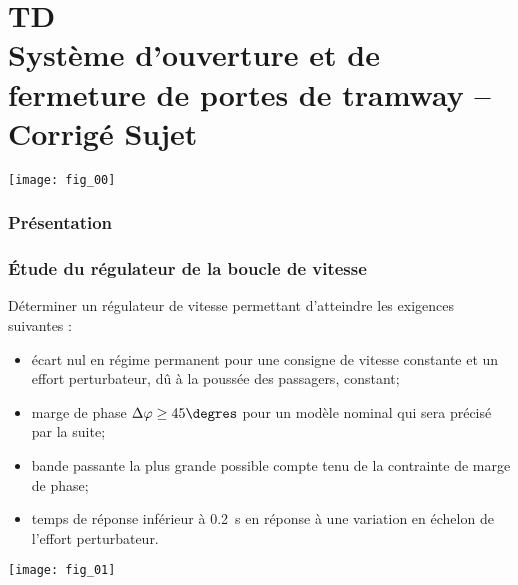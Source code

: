 \chapter*{TD  \\ 
Système d’ouverture et de fermeture de portes de tramway -- 
\ifprof Corrigé \else Sujet \fi}

\iflivret {} \else
\ifprof  {} \else \fi
\fi

\setcounter{question}{0}

\begin{marginfigure}[4cm]
\centering
\texttt{[image: fig\_00]}
\end{marginfigure}

\subsection*{Présentation}

\subsection*{Étude du régulateur de la boucle de vitesse}

\begin{obj}Déterminer un régulateur de vitesse permettant d’atteindre les exigences
suivantes :
\begin{itemize}
\item écart nul en régime permanent pour une consigne de vitesse constante et un effort perturbateur, dû à la poussée des passagers, constant;
\item marge de phase $\Delta \varphi \geq 45\degres$ pour un modèle nominal qui sera précisé par la suite;
\item bande passante la plus grande possible compte tenu de la contrainte de marge de phase;
\item temps de réponse inférieur à \SI{0,2}{s} en réponse à une variation en échelon de l’effort perturbateur.
\end{itemize}
\end{obj}


\begin{marginfigure}
\texttt{[image: fig\_01]}
\end{marginfigure}

